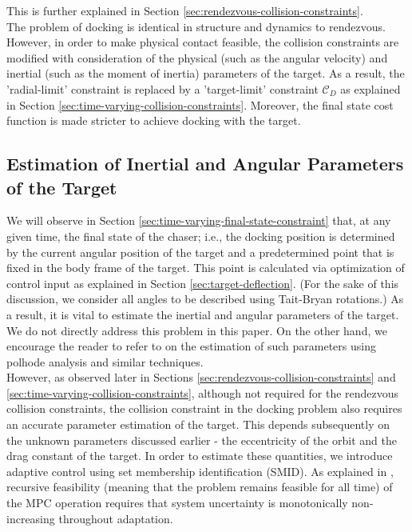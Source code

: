 This is further explained in Section \ref{sec:rendezvous-collision-constraints}.\\
The problem of docking is identical in structure and dynamics to rendezvous.
However, in order to make physical contact feasible, the collision constraints are modified with consideration of the physical (such as the angular velocity) and inertial (such as the moment of inertia) parameters of the target.
As a result, the 'radial-limit' constraint is replaced by a 'target-limit' constraint ${\mathcal{C}}_D$ as explained in Section \ref{sec:time-varying-collision-constraints}.
Moreover, the final state cost function is made stricter to achieve docking with the target.

\subsection{Estimation of Inertial and Angular Parameters of the Target}
\label{sec:target-estimation}
We will observe in Section \ref{sec:time-varying-final-state-constraint} that, at any given time, the final state of the chaser; i.e., the docking position is determined by the current angular position of the target and a predetermined point that is fixed in the body frame of the target.
This point is calculated via optimization of control input as explained in Section \ref{sec:target-deflection}.
(For the sake of this discussion, we consider all angles to be described using Tait-Bryan rotations.)
As a result, it is vital to estimate the inertial and angular parameters of the target.
We do not directly address this problem in this paper.
On the other hand, we encourage the reader to refer to \cite{setterfield2018inertial} on the estimation of such parameters using polhode analysis and similar techniques.\\
However, as observed later in Sections \ref{sec:rendezvous-collision-constraints} and \ref{sec:time-varying-collision-constraints}, although not required for the rendezvous collision constraints, the collision constraint in the docking problem also requires an accurate parameter estimation of the target.
This depends subsequently on the unknown parameters discussed earlier - the eccentricity of the orbit and the drag constant of the target.
In order to estimate these quantities, we introduce adaptive control using set membership identification (SMID).
As explained in \cite{morozov2020performance}, recursive feasibility (meaning that the problem remains feasible for all time) of the MPC operation requires that system uncertainty is monotonically non-increasing throughout adaptation.
